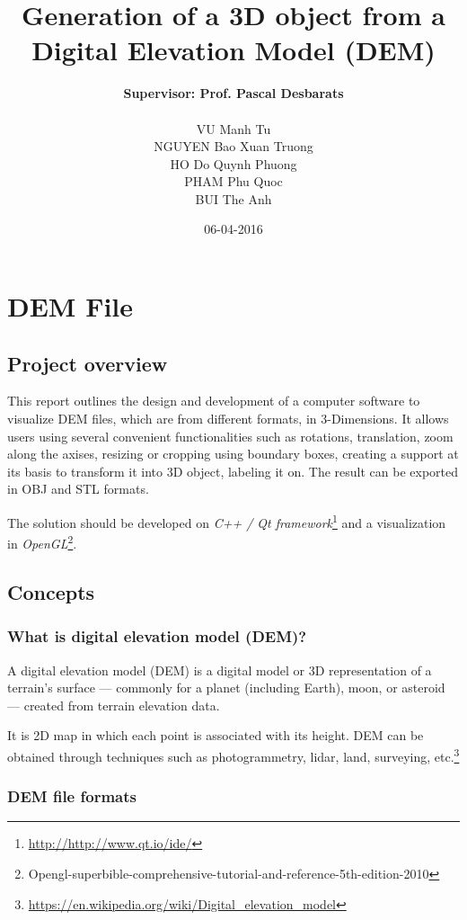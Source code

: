 \documentclass[11pt]{article}
\title{\textbf{Generation of a 3D object from a Digital Elevation Model (DEM)}}
\author{\textbf{Supervisor: Prof. Pascal Desbarats}\\\\
		VU Manh Tu\\
		NGUYEN Bao Xuan Truong\\
		HO Do Quynh Phuong\\
		PHAM Phu Quoc\\
		BUI The Anh		
		}
\date{06-04-2016}
\begin{document}
\maketitle
\section{DEM File}
\subsection{Project overview}
This report outlines the design and development of a computer software to visualize DEM files, which are from different formats, in 3-Dimensions. It allows users using several convenient functionalities such as rotations, translation, zoom along the axises, resizing or cropping using boundary boxes, creating a support at its basis to transform it into 3D object, labeling it on. The result can be exported in OBJ and STL formats. 

The solution should be developed on \emph{C++ / Qt framework}\footnote{\url{http://http://www.qt.io/ide/}} and a visualization in \emph{OpenGL}\footnote{Opengl-superbible-comprehensive-tutorial-and-reference-5th-edition-2010}.

\subsection{Concepts}
\subsubsection{What is digital elevation model (DEM)?}
A digital elevation model (DEM) is a digital model or 3D representation of a terrain's surface — commonly for a planet (including Earth), moon, or asteroid — created from terrain elevation data.
\par\noindent It is 2D map in which each point is associated with its height. DEM can be obtained through techniques such as photogrammetry, lidar, land, surveying, etc.\footnote{\url{https://en.wikipedia.org/wiki/Digital_elevation_model}}


\subsubsection{DEM file formats}
\end{document}
